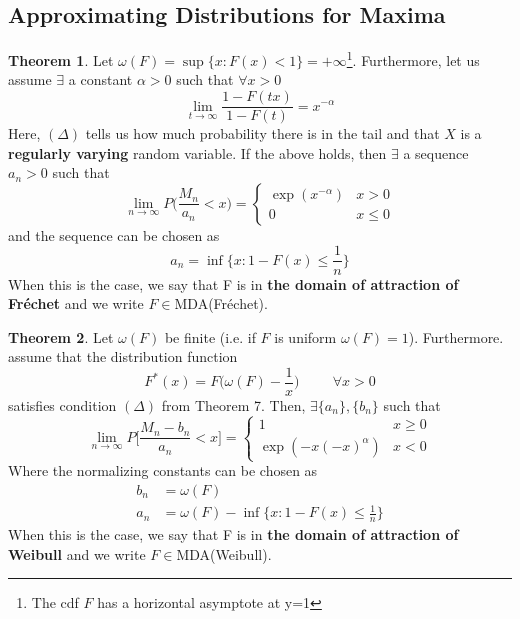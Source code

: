 \documentclass{article}
\theoremstyle{definition}
\newtheorem{theorem}{Theorem}
\theoremstyle{definition}
\def\w{\omega}
\begin{document}
\subsection{Approximating Distributions for Maxima}
\begin{theorem}
Let $\w(F)=\sup\{x:F(x)<1\}=+\infty$\footnote{The cdf $F$ has a horizontal asymptote at y=1}. Furthermore, let us assume $\exists$ a constant $\alpha>0$ such that $\forall x>0$
\[ \lim_{t\rightarrow \infty} \frac{1-F(tx)}{1-F(t)}=x^{-\alpha} \tag{$\Delta$}\]
Here, $(\Delta)$ tells us how much probability there is in the tail and that $X$ is a \textbf{regularly varying} random variable. If the above holds, then $\exists$ a sequence $a_n>0$ such that 
\[\lim_{n \rightarrow \infty} P\bigg( \frac{M_n}{a_n} <x \bigg)= \begin{cases}\exp (x^{-\alpha}) & x>0\\
0 & x\leq 0
\end{cases}\]
and the sequence can be chosen as 
\[ a_n=\inf \bigg\{ x:1-F(x)\leq \frac{1}{n} \bigg\}\]
When this is the case, we say that F is in \textbf{the domain of attraction of Fréchet} and we write $F\in $MDA(Fréchet).
\end{theorem}

\begin{theorem}
Let $\w(F)$ be finite (i.e. if $F$ is uniform $\w(F)=1$). Furthermore. assume that the distribution function 
\[F^*(x)=F\bigg(\w(F)-\frac{1}{x}\bigg) \hspace{1cm} \forall x>0 \]
satisfies condition $(\Delta)$ from Theorem 7. Then, $\exists \{a_n\}, \{b_n\}$ such that 
\[\lim_{n\rightarrow \infty}P \bigg[ \frac{M_n-b_n}{a_n} < x\bigg]=\begin{cases}1 & x\geq 0\\
\exp(-x(-x)^\alpha)&x<0
\end{cases}\]
Where the normalizing constants can be chosen as 
\begin{align*}
    b_n&=\w(F)\\
    a_n&=\w(F)- \inf\{x:1-F(x)\leq \frac{1}{n}\}
\end{align*}
When this is the case, we say that F is in \textbf{the domain of attraction of Weibull} and we write $F\in $MDA(Weibull).
\end{theorem}
\end{document}
